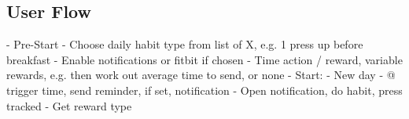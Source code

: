   \subsection{User Flow}
      - Pre-Start
        - Choose daily habit type from list of X, e.g. 1 press up before breakfast
        - Enable notifications or fitbit if chosen
        - Time action / reward, variable rewards, e.g. then work out average time to send, or none
      - Start:
        - New day
        - @ trigger time, send reminder, if set, notification
        - Open notification, do habit, press tracked
        - Get reward type





